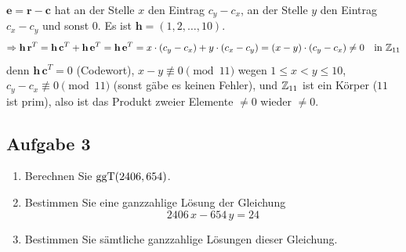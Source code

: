 \begin{loesung}
$\mathbf{e} = \mathbf{r} - \mathbf{c}$ hat an der Stelle $x$ den Eintrag $c_y - c_x$, an der Stelle $y$ den Eintrag $c_x - c_y$ und sonst $0$. Es ist $\mathbf{h} = (1, 2, \dots, 10)$.
\[
\Rightarrow \mathbf{h}\,\mathbf{r}^T = \mathbf{h}\,\mathbf{c}^T + \mathbf{h}\,\mathbf{e}^T = \mathbf{h}\,\mathbf{e}^T = x \cdot (c_y - c_x) + y \cdot (c_x - c_y) = (x - y) \cdot (c_y - c_x) \neq 0 \quad \text{in } \mathbb{Z}_{11}
\]
denn $\mathbf{h}\,\mathbf{c}^T = 0$ (Codewort), $x - y \not\equiv 0 \pmod{11}$ wegen $1 \le x < y \le 10$, $c_y - c_x \not\equiv 0 \pmod{11}$ (sonst gäbe es keinen Fehler), und $\mathbb{Z}_{11}$ ist ein Körper ($11$ ist prim), also ist das Produkt zweier Elemente $\neq 0$ wieder $\neq 0$.
\end{loesung}

\subsection{Aufgabe 3}

\begin{aufgabe}[Aufgabe 3]
\begin{enumerate}[label=\alph*)]
\item Berechnen Sie $\operatorname{ggT}(2406, 654)$.
\item Bestimmen Sie eine ganzzahlige Lösung der Gleichung
\[ 2406\,x - 654\,y = 24 \]
\item Bestimmen Sie sämtliche ganzzahlige Lösungen dieser Gleichung.
\end{enumerate}
\end{aufgabe}

